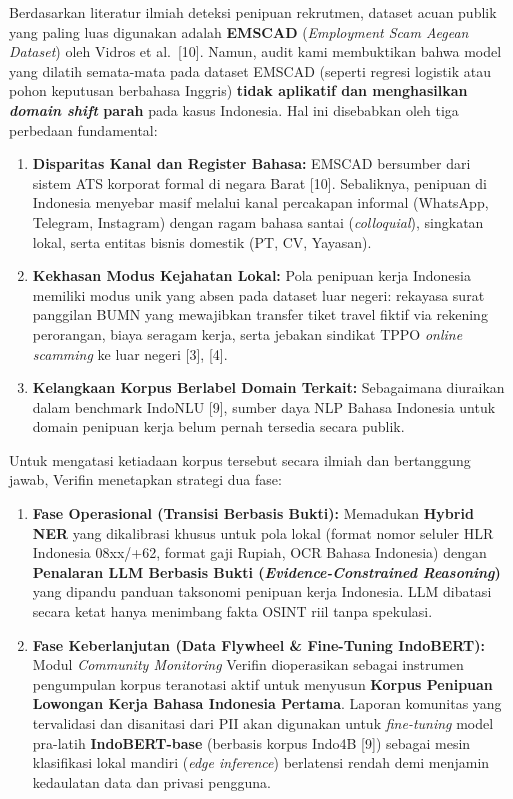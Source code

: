 \documentclass[12pt,a4paper]{article}
\begin{document}
\begin{blokkuning}
Berdasarkan literatur ilmiah deteksi penipuan rekrutmen, dataset acuan publik yang paling luas
digunakan adalah \textbf{EMSCAD} (\textit{Employment Scam Aegean Dataset}) oleh Vidros et al.\ [10].
Namun, audit kami membuktikan bahwa model yang dilatih semata-mata pada dataset EMSCAD (seperti regresi
logistik atau pohon keputusan berbahasa Inggris) \textbf{tidak aplikatif dan menghasilkan \textit{domain shift}
parah} pada kasus Indonesia. Hal ini disebabkan oleh tiga perbedaan fundamental:
\begin{enumerate}[label=\textbf{\alph*.}]
\item \textbf{Disparitas Kanal dan Register Bahasa:} EMSCAD bersumber dari sistem ATS korporat formal
      di negara Barat [10]. Sebaliknya, penipuan di Indonesia menyebar masif melalui kanal percakapan
      informal (WhatsApp, Telegram, Instagram) dengan ragam bahasa santai (\textit{colloquial}),
      singkatan lokal, serta entitas bisnis domestik (PT, CV, Yayasan).
\item \textbf{Kekhasan Modus Kejahatan Lokal:} Pola penipuan kerja Indonesia memiliki modus unik yang
      absen pada dataset luar negeri: rekayasa surat panggilan BUMN yang mewajibkan transfer tiket travel
      fiktif via rekening perorangan, biaya seragam kerja, serta jebakan sindikat TPPO \textit{online scamming}
      ke luar negeri [3], [4].
\item \textbf{Kelangkaan Korpus Berlabel Domain Terkait:} Sebagaimana diuraikan dalam benchmark IndoNLU [9],
      sumber daya NLP Bahasa Indonesia untuk domain penipuan kerja belum pernah tersedia secara publik.
\end{enumerate}

Untuk mengatasi ketiadaan korpus tersebut secara ilmiah dan bertanggung jawab, Verifin menetapkan strategi dua fase:
\begin{enumerate}[label=\textbf{\arabic*.}]
\item \textbf{Fase Operasional (Transisi Berbasis Bukti):} Memadukan \textbf{Hybrid NER} yang dikalibrasi
      khusus untuk pola lokal (format nomor seluler HLR Indonesia 08xx/+62, format gaji Rupiah, OCR Bahasa Indonesia)
      dengan \textbf{Penalaran LLM Berbasis Bukti (\textit{Evidence-Constrained Reasoning})} yang dipandu
      panduan taksonomi penipuan kerja Indonesia. LLM dibatasi secara ketat hanya menimbang fakta OSINT riil tanpa spekulasi.
\item \textbf{Fase Keberlanjutan (Data Flywheel \& Fine-Tuning IndoBERT):} Modul \textit{Community Monitoring}
      Verifin dioperasikan sebagai instrumen pengumpulan korpus teranotasi aktif untuk menyusun
      \textbf{Korpus Penipuan Lowongan Kerja Bahasa Indonesia Pertama}. Laporan komunitas yang tervalidasi dan
      disanitasi dari PII akan digunakan untuk \textit{fine-tuning} model pra-latih \textbf{IndoBERT-base}
      (berbasis korpus Indo4B [9]) sebagai mesin klasifikasi lokal mandiri (\textit{edge inference}) berlatensi
      rendah demi menjamin kedaulatan data dan privasi pengguna.
\end{enumerate}


\end{blokkuning}
\end{document}
